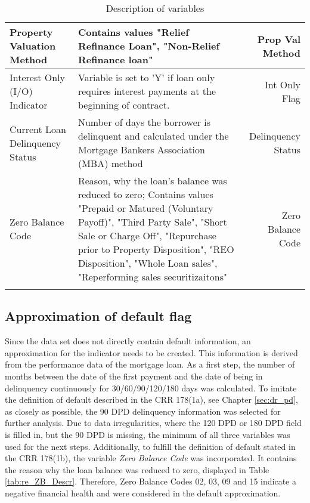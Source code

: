 \begin{longtable}{ Lp{8cm}R }
Property Valuation Method                 & Contains values "Relief Refinance Loan", "Non-Relief Refinance loan"                                                                                                                                                                                                                 & Prop Val Method    \\\hline
Interest Only (I/O) Indicator             & Variable is set to 'Y' if loan only requires interest payments at the beginning of contract.                                                                                                                                                                                         & Int Only Flag      \\\hline
Current Loan Delinquency Status           & Number of days the borrower is delinquent and calculated under the Mortgage Bankers Association (MBA) method                                                                                                                                                                         & Delinquency Status \\\hline
Zero Balance Code                         & Reason, why the loan's balance was reduced to zero; Contains values "Prepaid or Matured (Voluntary Payoff)", "Third Party Sale", "Short Sale or Charge Off", "Repurchase prior to Property Disposition", "REO Disposition", "Whole Loan sales", "Reperforming sales securitizaitons" & Zero Balance Code 
\\\bottomrule

\caption{Description of variables}
\label{tab:re_descr}
\end{longtable}

\subsection{Approximation of default flag}
\label{sec:aprox_def}

Since the data set does not directly contain default information, an approximation for the indicator needs to be created. This information is derived from the performance data of the mortgage loan. As a first step, the number of months between the date of the first payment and the date of being in delinquency continuously for 30/60/90/120/180 days was calculated. To imitate the definition of default described in the CRR 178(1a), see Chapter \ref{sec:dr_pd}, as closely as possible, the 90 \ac{DPD} delinquency information was selected for further analysis. Due to data irregularities, where the 120 \ac{DPD} or 180 \ac{DPD} field is filled in, but the 90 \ac{DPD} is missing, the minimum of all three variables was used for the next steps. Additionally, to fulfill the definition of default stated in the CRR 178(1b), the variable \emph{Zero Balance Code} was incorporated. It contains the reason why the loan balance was reduced to zero, displayed in Table \ref{tab:re_ZB_Descr}. Therefore, Zero Balance Codes 02, 03, 09 and 15 indicate a negative financial health and were considered in the default approximation.


